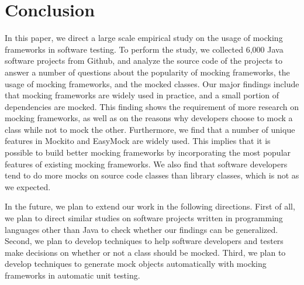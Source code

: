 \section{Conclusion}
\label{sec:concludemock}
In this paper, we direct a large scale empirical study on the usage of mocking frameworks in software testing. To perform the study, we collected 6,000 Java software projects from Github, and analyze the source code of the projects to answer a number of questions about the popularity of mocking frameworks, the usage of mocking frameworks, and the mocked classes. 
Our major findings include that mocking frameworks are widely used in practice, and a small portion of dependencies are mocked. This finding shows the requirement of more research on mocking frameworks, as well as on the reasons why developers choose to mock a class while not to mock the other. Furthermore, we find that a number of unique features in Mockito and EasyMock are widely used. This implies that it is possible to build better mocking frameworks by incorporating the most popular features of existing mocking frameworks. We also find that software developers tend to do more mocks on source code classes than library classes, which is not as we expected. 

In the future, we plan to extend our work in the following directions. First of all, we plan to direct similar studies on software projects written in programming languages other than Java to check whether our findings can be generalized. Second, we plan to develop techniques to help software developers and testers make decisions on whether or not a class should be mocked. Third, we plan to develop techniques to generate mock objects automatically with mocking frameworks in automatic unit testing. 